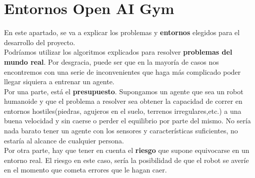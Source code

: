 \documentclass[11pt,fleqn]{book} %
\begin{document}
%
%
%

\chapter{Entornos Open AI Gym}\label{sec:entornos}

En este apartado, se va a explicar los problemas y \textbf{entornos} elegidos para el desarrollo del proyecto. \\

Podríamos utilizar los algoritmos explicados para resolver \textbf{problemas del mundo real}. Por desgracia, puede ser que en la mayoría de casos nos encontremos con una serie de inconvenientes que haga más complicado poder llegar siquiera a entrenar un agente. \\

Por una parte, está el \textbf{presupuesto}. Supongamos un agente que sea un robot humanoide y que el problema a resolver sea obtener la capacidad de correr en entornos hostiles(piedras, agujeros en el suelo, terrenos irregulares,etc.) a una buena velocidad y sin caerse o perder el equilibrio por parte del mismo. No sería nada barato tener un agente con los sensores y características suficientes, no estaría al alcance de cualquier persona. \\

Por otra parte, hay que tener en cuenta el \textbf{riesgo} que supone equivocarse en un entorno real. El riesgo en este caso, sería la posibilidad de que el robot se averíe en el momento que cometa errores que le hagan caer. \\
\end{document}
